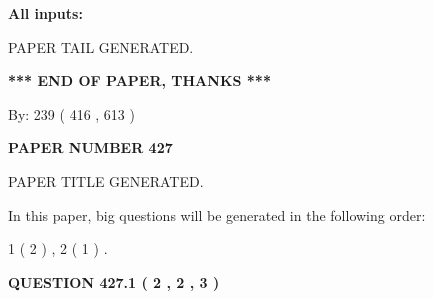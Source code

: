 \documentclass[12pt]{article}
\begin{document}
   
   
   
\noindent{}
   
   
   
   
\noindent\vspace{0.1in}\hspace{-0.08in} {\textbf{\Large{All inputs: }}}
   
   
   
   
   
   
 \vspace{0.2in}
 
   
   
\vspace{2.0in} PAPER TAIL GENERATED.
   
   
   
   
\vspace{1.0in} 
{\textbf{\large{ *** END OF PAPER, THANKS *** }}} 
   
   
\hspace{1.0in} By: 
 239 ( 416 ,  613 )
   
   
   
   
\newpage 
\setcounter{page}{ 
   427001 } 
   
   
   
   
 {\textbf{ \Large{ PAPER NUMBER  427  }}}
   
   
\vspace{0.2in}
   
   
   
   
   
   
   
   
 \vspace{0.2in}
 
 
 
 
   
   
 PAPER TITLE GENERATED.
   
   
   
\vspace{0.2in}
   
In this paper, big questions will be generated in the following order: 
   
   
   1 ( 2 )
 ,
   2 ( 1 )
 .
  
\vspace{0.2in}
  
{\textbf{\Large{QUESTION
427.1 
 ( 2 , 2 , 3 )
}}}
  
\end{document}
